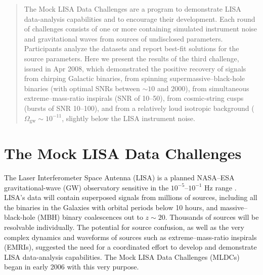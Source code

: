 \documentclass{iopart}
\begin{document}

\begin{abstract}
The Mock LISA Data Challenges are a program to demonstrate LISA data-analysis capabilities and to encourage their development. Each round of challenges consists of one or more containing simulated instrument noise and gravitational waves from sources of undisclosed parameters. Participants analyze the datasets and report best-fit solutions for the source parameters. Here we present the results of the third challenge, issued in Apr 2008, which demonstrated the positive recovery of signals from chirping Galactic binaries, from spinning supermassive--black-hole binaries (with optimal SNRs between $\sim 10$ and $2000$), from simultaneous extreme--mass-ratio inspirals (SNR of 10--50), from cosmic-string cusps (bursts of SNR 10--100), and from a relatively loud isotropic background ($\Omega_\mathrm{gw} \sim 10^{-11}$, slightly below the LISA instrument noise.
\end{abstract}

\vspace{-18pt}


\section{The Mock LISA Data Challenges}

The Laser Interferometer Space Antenna (LISA) is a planned NASA--ESA gravitational-wave (GW) observatory sensitive in the $10^{-5}$--$10^{-1}$ Hz range \cite{lisa}. LISA's data will contain superposed signals from millions of sources, including all the binaries in the Galaxies with orbital periods below 10 hours, and massive--black-hole (MBH) binary coalescences out to $z \sim 20$. Thousands of sources will be resolvable individually. The potential for source confusion, as well as the very complex dynamics and waveforms of sources such as extreme--mass-ratio inspirals (EMRIs), suggested the need for a coordinated effort to develop and demonstrate LISA data-analysis capabilities. The Mock LISA Data Challenges (MLDCs) began in early 2006 with this very purpose.
\end{document}
